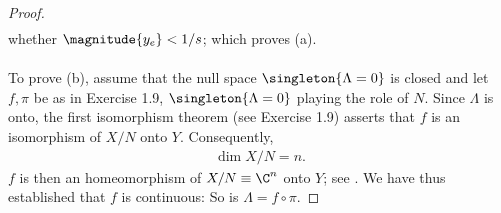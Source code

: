 \begin{proof}
\begin{align}
  \end{align}
%
whether $\magnitude{y_e} < 1/s$; which proves (a).\\\\
%
%
To prove (b), assume that the null space 
%
  $\singleton{\Lambda = 0}$ %
% 
is closed and let $f, \pi$ be as in Exercise 1.9,  %
%
  $\singleton{\Lambda = 0}$ %
%
playing the role of $N$.
%
Since $\Lambda$ is onto, the first isomorphism theorem (see Exercise 1.9) 
asserts that 
%
  $f$ is an isomorphism of $X/N$ onto $Y$. 
%
Consequently, 
%
  \begin{align}
    \dim X/N= n.
  \end{align}
% 
$f$ is then an homeomorphism of 
%
  $X/N\equiv \C^{n}$ 
%
onto $Y$; see .
We have thus established that $f$ is continuous: So is $\Lambda = f\circ \pi$.
\end{proof}